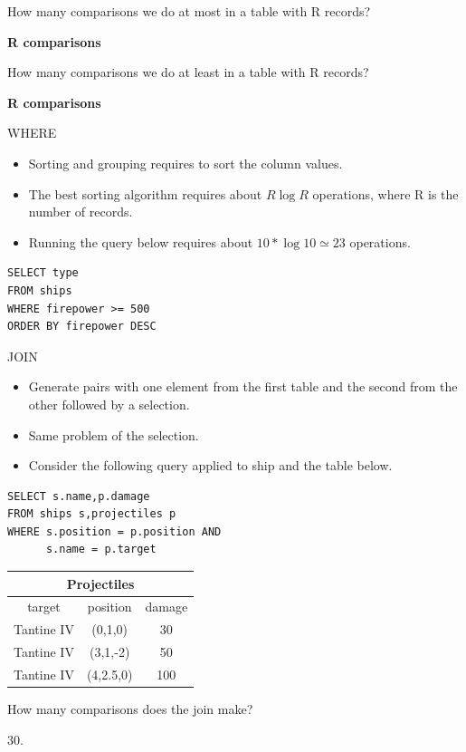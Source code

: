 \documentclass{beamer}
\begin{document}
\begin{slide}{
\item How many comparisons we do at most in a table with R records?
\pause
\item \textbf{R comparisons}
\pause
\item How many comparisons we do at least in a table with R records?
\pause
\item \textbf{R comparisons}
}\end{slide}

\begin{frame}[fragile]{WHERE}
\begin{itemize}
\item Sorting and grouping requires to sort the column values.
\item The best sorting algorithm requires about $R\log R$ operations, where R is the number of records.
\item Running the query below requires about $10 * \log 10 \simeq 23$ operations.
\end{itemize}

\begin{lstlisting}
SELECT type
FROM ships
WHERE firepower >= 500
ORDER BY firepower DESC
\end{lstlisting}
\end{frame}

\begin{frame}[fragile]{JOIN}
\begin{itemize}
\item Generate pairs with one element from the first table and the second from the other followed by a selection.
\item Same problem of the selection.
\item Consider the following query applied to ship and the table below.
\end{itemize}

\begin{lstlisting}
SELECT s.name,p.damage
FROM ships s,projectiles p
WHERE s.position = p.position AND
      s.name = p.target
\end{lstlisting}




\tiny
\begin{tabular}{|c|c|c|}
\hline
\multicolumn{3}{|c|}{\textbf{Projectiles}} \\
\hline
target & position & damage \\
\hline
Tantine IV & (0,1,0) & 30 \\
\hline
Tantine IV & (3,1,-2) & 50 \\
\hline
Tantine IV & (4,2.5,0) & 100 \\
\hline
\end{tabular} 
\end{frame}

\begin{slide}{
\item How many comparisons does the join make?
\pause
\item 30.
}\end{slide}
\end{document}
